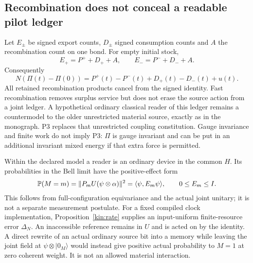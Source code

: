 \documentclass[11pt]{article}
\theoremstyle{definition}\newtheorem{definition}[theorem]{Definition}
\theoremstyle{remark}\newtheorem{remark}[theorem]{Remark}
\begin{document}
\subsection{Recombination does not conceal a readable pilot ledger}
Let $E_\pm$ be signed export counts, $D_\pm$ signed consumption counts and $A$ the recombination count on one bond. For empty initial stock,
\[
 E_+=P^++D_++A,\qquad E_-=P^-+D_-+A.
\]
Consequently
\begin{equation}
 N(\Pi(t)-\Pi(0))=P^+(t)-P^-(t)+D_+(t)-D_-(t)+u(t).
 \label{eq:ledger}
\end{equation}
All retained recombination products cancel from the signed identity. Fast recombination removes surplus service but does not erase the source action from a joint ledger. A hypothetical ordinary classical reader of this ledger remains a countermodel to the older unrestricted material source, exactly as in the monograph. P3 replaces that unrestricted coupling constitution. Gauge invariance and finite work do not imply P3: $\Pi$ is gauge invariant and can be put in an additional invariant mixed energy if that extra force is permitted.

Within the declared model a reader is an ordinary device in the common $H$. Its probabilities in the Bell limit have the positive-effect form
\begin{equation}
 \mathbb P(M=m)=\|P_mU(\psi\otimes\alpha)\|^2
       =\langle\psi,E_m\psi\rangle,\qquad 0\le E_m\le I.
 \label{eq:effect}
\end{equation}
This follows from full-configuration equivariance and the actual joint unitary; it is not a separate measurement postulate. For a fixed compiled clock implementation, Proposition~\ref{kin:rate} supplies an input-uniform finite-resource error $\Delta_N$. An inaccessible reference remains in $U$ and is acted on by the identity. A direct rewrite of an actual ordinary source bit into a memory while leaving the joint field at $\psi\otimes|0_M\rangle$ would instead give positive actual probability to $M=1$ at zero coherent weight. It is not an allowed material interaction.
\end{document}
